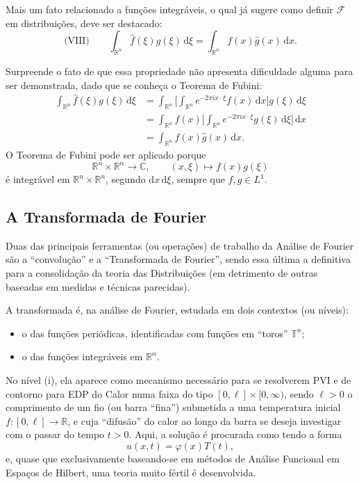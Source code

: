\documentclass[../distribution_theory_notes.tex]{subfiles}
\begin{document}
Mais um fato relacionado a funções integráveis, o qual já sugere como definir \(\mathcal{F}\) em distribuições, deve ser destacado:
\[
	\text{(VIII)}\qquad \int_{\mathbb{R}^{n}}\hat{f}(\xi )g(\xi )\,\mathrm{d}\xi
	=\int_{\mathbb{R}^{n}}f(x)\hat{g}(x)\,\mathrm{d}x.
\]
\begin{proof*}
	Surpreende o fato de que essa propriedade não apresenta dificuldade alguma para ser demonstrada, dado que se conheça o Teorema de Fubini:
	\begin{align*}
		\int_{\mathbb{R}^{n}}\hat{f}(\xi )g(\xi )\,\mathrm{d}\xi
		 & =\int_{\mathbb{R}^{n}}\biggl[\int_{\mathbb{R}^{n}}e^{-2\pi i x\cdot \xi }f(x)\,\mathrm{d}x\biggr]g(\xi )\,\mathrm{d}\xi \\
		 & =\int_{\mathbb{R}^{n}}f(x)\biggl[\int_{\mathbb{R}^{n}}e^{-2\pi i x\cdot \xi }g(\xi )\,\mathrm{d}\xi\biggr]\,\mathrm{d}x \\
		 & =\int_{\mathbb{R}^{n}}f(x)\hat{g}(x)\,\mathrm{d}x.
	\end{align*}
	O Teorema de Fubini pode ser aplicado porque
	\[
		\mathbb{R}^{n}\times \mathbb{R}^{n}\longrightarrow \mathbb{C},\qquad (x,\xi )\longmapsto f(x)g(\xi )
	\]
	é integrável em \(\mathbb{R}^{n}\times \mathbb{R}^{n}\), segundo \(\mathrm{d}x\,\mathrm{d}\xi\), sempre que \(f,g\in L^{1}\). \qedsymbol
\end{proof*}

\subsection{A Transformada de Fourier}
Duas das principais ferramentas (ou operações) de trabalho da Análise de Fourier são a ``convolução'' e a ``Transformada de Fourier'', sendo essa última a definitiva para a consolidação da teoria das Distribuições (em detrimento de outras baseadas em medidas e técnicas parecidas).

A transformada é, na análise de Fourier, estudada em dois contextos (ou níveis):
\begin{itemize}
	\item[(i)] o das funções periódicas, identificadas com funções em ``toros'' \(\mathbb{T}^{n}\);
	\item[(ii)] o das funções integráveis em \(\mathbb{R}^{n}\).
\end{itemize}
No nível (i), ela aparece como mecanismo necessário para se resolverem PVI e de contorno para EDP do Calor numa faixa do tipo \([0,\ell ]\times [0,\infty )\), sendo \(\ell >0\) o comprimento de um fio (ou barra ``fina'') submetida a uma temperatura inicial \(f:[0,\ell ]\rightarrow \mathbb{R}\), e cuja ``difusão'' do calor ao longo da barra se deseja investigar com o passar do tempo \(t>0\). Aqui, a solução é procurada como tendo a forma
\[
	u(x,t)=\varphi (x)T(t),
\]
e, quase que exclusivamente baseando-se em métodos de Análise Funcional em Espaços de Hilbert, uma teoria muito fértil é desenvolvida.
\end{document}

